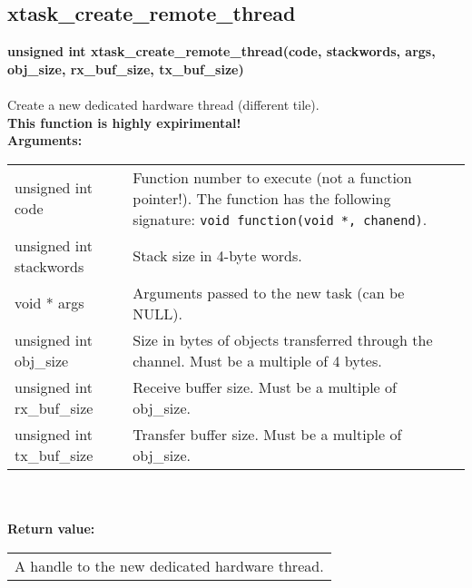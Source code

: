 \begin{samepage}
\subsection{xtask\_create\_remote\_thread}
\noindent
\textbf{unsigned int xtask\_create\_remote\_thread(code, stackwords, args, obj\_size, rx\_buf\_size, tx\_buf\_size)}\\\\
Create a new dedicated hardware thread (different tile).\\
\textbf{This function is highly expirimental!}\\

\noindent
\textbf{Arguments:}\\
\indent\begin{tabular}{ p{4.5cm}  p{9cm} }
unsigned int code           & Function number to execute (not a function pointer!).
                              The function has the following signature: 
                              \verb|void function(void *, chanend)|.\\
unsigned int stackwords     & Stack size in 4-byte words.\\
void * args                 & Arguments passed to the new task (can be NULL).\\
unsigned int obj\_size      & Size in bytes of objects transferred through 
                              the channel.
                              Must be a multiple of 4 bytes.\\
unsigned int rx\_buf\_size  & Receive buffer size. Must be a multiple of obj\_size.\\
unsigned int tx\_buf\_size  & Transfer buffer size. Must be a multiple of obj\_size.       
\end{tabular}\\\\

\noindent
\textbf{Return value:}\\
\indent\begin{tabular}{  p{13.5cm} }
A handle to the new dedicated hardware thread.
\end{tabular}
\end{samepage}

